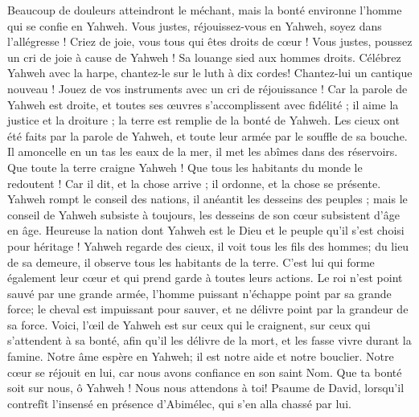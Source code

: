 \begin{multicols}{2}
Beaucoup de douleurs atteindront le méchant, mais la bonté environne l'homme qui se confie en Yahweh.
Vous justes, réjouissez-vous en Yahweh, soyez dans l'allégresse ! Criez de joie, vous tous qui êtes droits de cœur !
\VerseOne{}Vous justes, poussez un cri de joie à cause de Yahweh ! Sa louange sied aux hommes droits.
Célébrez Yahweh avec la harpe, chantez-le sur le luth à dix cordes!
Chantez-lui un cantique nouveau ! Jouez de vos instruments avec un cri de réjouissance !
Car la parole de Yahweh est droite, et toutes ses œuvres s'accomplissent avec fidélité ;
il aime la justice et la droiture ; la terre est remplie de la bonté de Yahweh.
Les cieux ont été faits par la parole de Yahweh, et toute leur armée par le souffle de sa bouche.
Il amoncelle en un tas les eaux de la mer, il met les abîmes dans des réservoirs.
Que toute la terre craigne Yahweh ! Que tous les habitants du monde le redoutent !
Car il dit, et la chose arrive ; il ordonne, et la chose se présente.
Yahweh rompt le conseil des nations, il anéantit les desseins des peuples ;
mais le conseil de Yahweh subsiste à toujours, les desseins de son cœur subsistent d'âge en âge.
Heureuse la nation dont Yahweh est le Dieu et le peuple qu'il s'est choisi pour héritage !
Yahweh regarde des cieux, il voit tous les fils des hommes;
du lieu de sa demeure, il observe tous les habitants de la terre.
C'est lui qui forme également leur cœur et qui prend garde à toutes leurs actions.
Le roi n'est point sauvé par une grande armée, l'homme puissant n'échappe point par sa grande force;
le cheval est impuissant pour sauver, et ne délivre point par la grandeur de sa force.
Voici, l'œil de Yahweh est sur ceux qui le craignent, sur ceux qui s'attendent à sa bonté,
afin qu'il les délivre de la mort, et les fasse vivre durant la famine.
Notre âme espère en Yahweh; il est notre aide et notre bouclier.
Notre cœur se réjouit en lui, car nous avons confiance en son saint Nom.
Que ta bonté soit sur nous, ô Yahweh ! Nous nous attendons à toi!
\VerseOne{}Psaume de David, lorsqu'il contrefît l'insensé en présence d'Abimélec, qui s'en alla chassé par lui.

\end{multicols}
